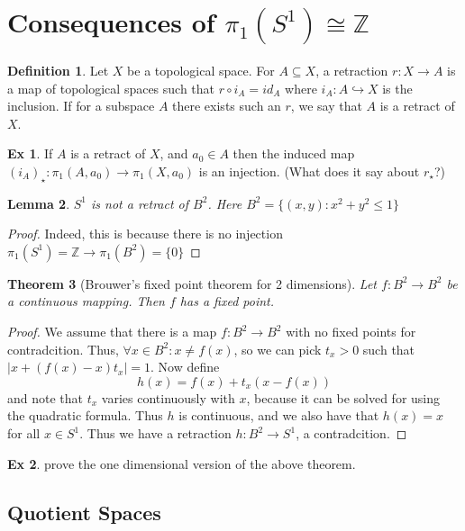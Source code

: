 \documentclass[10pt, openany]{book}
\newcommand{\bb}[1]{\mathbb{#1}}
\theoremstyle{plain}
\newtheorem{theorem}{Theorem}[section]
\newtheorem{lemma}[theorem]{Lemma}
\theoremstyle{definition}
\newtheorem{definition}[theorem]{Definition}
\newtheorem{exercise}{Ex}[section]
\theoremstyle{remark}
\begin{document}
\section{Consequences of $\pi_1(S^1)\cong \bb Z$}

\begin{definition}
  Let $X$ be a topological space. For $A\subseteq X$, a retraction $r: X\rightarrow A$ is a map of topological spaces such that $r\circ i_A = id_A$ where $i_A : A\hookrightarrow X$ is the inclusion. If for a subspace $A$ there exists such an $r$, we say that $A$ is a retract of $X$.
\end{definition}
\begin{exercise}
  If $A$ is a retract of $X$, and $a_0\in A$ then the induced map $(i_A)_{\star} : \pi_1(A,a_0)\rightarrow \pi_1(X,a_0)$ is an injection. (What does it say about $r_\star$?)
\end{exercise}

\begin{lemma}
  $S^1$ is not a retract of $B^2$. Here $B^2 = \{(x,y) : x^2 + y^2 \leq 1\}$
\end{lemma}
\begin{proof}
  Indeed, this is because there is no injection $ \pi_1(S^1) = \bb Z\rightarrow \pi_1(B^2) = \{0\}$ 
\end{proof}
\begin{theorem}[Brouwer's fixed point theorem for 2 dimensions]
  Let $f: B^2\rightarrow B^2$ be a continuous mapping. Then $f$ has a fixed point.
\end{theorem}
\begin{proof}
  We assume that there is a map $f: B^2\rightarrow B^2$ with no fixed points for contradcition. Thus, $\forall x\in B^2:  x\neq f(x)$, so we can pick $t_x > 0$ such that $|x + (f(x) - x)t_x| = 1$. Now define $$h(x) = f(x) + t_x(x - f(x))$$ and note that $t_x$ varies continuously with $x$, because it can be solved for using the quadratic formula. Thus $h$ is continuous, and we also have that $h(x) = x$ for all $x\in S^1$. Thus we have a retraction $h: B^2\rightarrow S^1$, a contradcition.
\end{proof}
\begin{exercise}
  prove the one dimensional version of the above theorem.
\end{exercise}

\subsection{Quotient Spaces }
\end{document}
